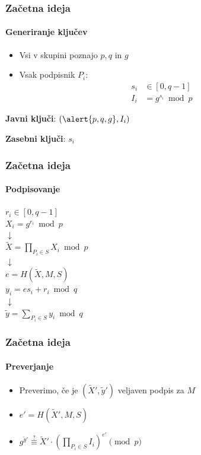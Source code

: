 \documentclass{beamer}    %
\begin{document}
\begin{frame}
    \frametitle{Začetna ideja}
    \framesubtitle{Generiranje ključev}
    \begin{itemize}
        \item Vsi v skupini poznajo \alert{$p, q$} in \alert{$g$}
        \item Vsak podpisnik $P_i$: 
            \begin{align*}
                s_i &\in [0, q-1] \\
                I_i &= g^{s_i} \bmod{p}
            \end{align*}
    \end{itemize}
    \vspace{1cm}
    \begin{multicols*}{2}
        \textbf{Javni ključi}: $(\alert{p, q, g}, I_i)$
        \columnbreak

        \textbf{Zasebni ključi}: $s_i$
    \end{multicols*}
\end{frame}

\begin{frame}
    \frametitle{Začetna ideja}
    \framesubtitle{Podpisovanje}
    \begin{center}
        $r_i \in [0, q-1]$ \\
        $X_i = g^{r_i} \bmod{p}$ \\
        \vspace{0.25cm}
        $\downarrow$ \\
        \vspace{0.25cm}
        $\tilde{X} = \prod_{P_i \in S} X_i \bmod{p}$ \\
        \vspace{0.25cm}
        $\downarrow$ \\
        \vspace{0.25cm}
        $e = H(\tilde{X}, M, S)$ \\
        $y_i = e s_i + r_i \bmod{q}$ \\
        \vspace{0.25cm}
        $\downarrow$ \\
        \vspace{0.25cm}
        $\tilde{y} = \sum_{P_i \in S} y_i \bmod{q}$ \\
    \end{center}
\end{frame}

\begin{frame}
    \frametitle{Začetna ideja}
    \framesubtitle{Preverjanje}
    \begin{itemize}
        \item Preverimo, če je $(\tilde{X}', \tilde{y}')$ veljaven podpis za $M$
        \item $e' = H(\tilde{X}', M, S)$
        \item $g^{\tilde{y}'} \stackrel{?}{\equiv} 
            \tilde{X}' \cdot (\prod_{P_i \in S} I_i)^{e'} \pmod{p}$   
    \end{itemize}
\end{frame}
\end{document}
